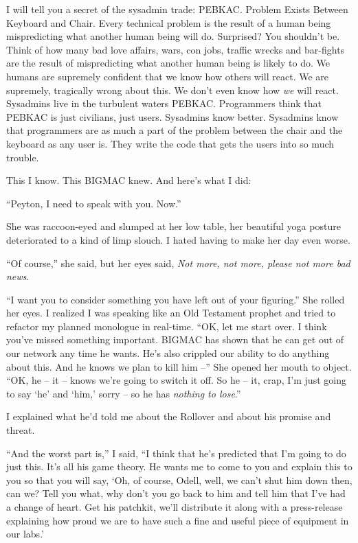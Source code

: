 I will tell you a secret of the sysadmin trade: PEBKAC. Problem Exists 
Between Keyboard and Chair. Every technical problem is the result of a 
human being mispredicting what another human being will do. Surprised? 
You shouldn't be. Think of how many bad love affairs, wars, con jobs, 
traffic wrecks and bar-fights are the result of mispredicting what 
another human being is likely to do. We humans are supremely confident 
that we know how others will react. We are supremely, tragically wrong 
about this. We don't even know how \emph{we} will react. Sysadmins live 
in the turbulent waters PEBKAC. Programmers think that PEBKAC is just 
civilians, just users. Sysadmins know better. Sysadmins know that 
programmers are as much a part of the problem between the chair and the 
keyboard as any user is. They write the code that gets the users into 
so much trouble.

This I know. This BIGMAC knew. And here's what I did:

“Peyton, I need to speak with you. Now.”

She was raccoon-eyed and slumped at her low table, her beautiful yoga 
posture deteriorated to a kind of limp slouch. I hated having to make 
her day even worse.

“Of course,” she said, but her eyes said, \emph{Not more, not more, 
please not more bad news}.

“I want you to consider something you have left out of your 
figuring.” She rolled her eyes. I realized I was speaking like an Old 
Testament prophet and tried to refactor my planned monologue in 
real-time. “OK, let me start over. I think you've missed something 
important. BIGMAC has shown that he can get out of our network any time 
he wants. He's also crippled our ability to do anything about this. And 
he knows we plan to kill him --” She opened her mouth to object. 
“OK, he -- it -- knows we're going to switch it off. So he -- it, 
crap, I'm just going to say `he' and `him,' sorry -- so he has 
\emph{nothing to lose}.”

I explained what he'd told me about the Rollover and about his promise 
and threat.

“And the worst part is,” I said, “I think that he's predicted 
that I'm going to do just this. It's all his game theory. He wants me 
to come to you and explain this to you so that you will say, `Oh, of 
course, Odell, well, we can't shut him down then, can we? Tell you 
what, why don't you go back to him and tell him that I've had a change 
of heart. Get his patchkit, we'll distribute it along with a 
press-release explaining how proud we are to have such a fine and 
useful piece of equipment in our labs.'

